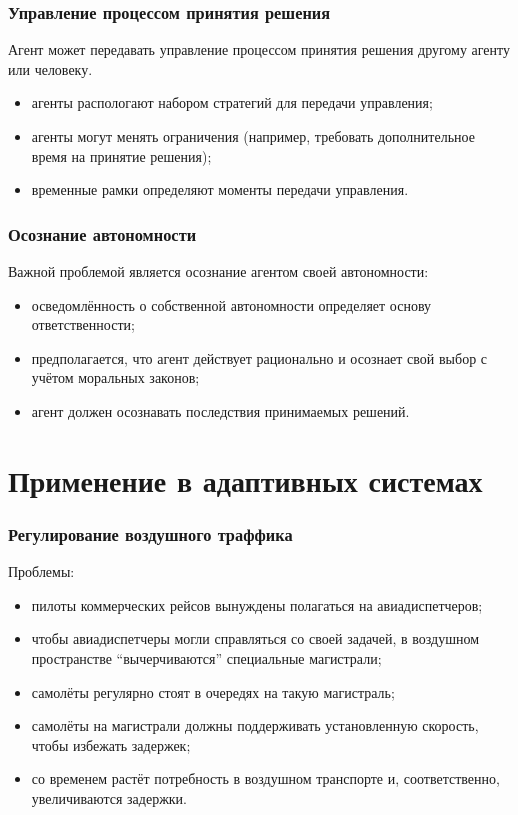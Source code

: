 \documentclass{beamer}
\begin{document}
\begin{frame}
  \frametitle{Управление процессом принятия решения}
  Агент может передавать управление процессом принятия решения другому агенту или человеку.
  \begin{itemize}
    \item агенты распологают набором стратегий для передачи управления;
    \item агенты могут менять ограничения (например,
      требовать дополнительное время на принятие решения);
    \item временные рамки определяют моменты передачи управления.
  \end{itemize}
\end{frame}

\begin{frame}
  \frametitle{Осознание автономности}
  Важной проблемой является осознание агентом своей автономности:
  \begin{itemize}
    \item осведомлённость о собственной автономности определяет основу ответственности;
    \item предполагается, что агент действует рационально и осознает свой выбор
      с учётом моральных законов;
    \item агент должен осознавать последствия принимаемых решений.
  \end{itemize}
\end{frame}

\section{Применение в адаптивных системах}

\begin{frame}
  \frametitle{Регулирование воздушного траффика}
  Проблемы:
  \begin{itemize}
    \item пилоты коммерческих рейсов вынуждены полагаться на авиадиспетчеров;
    \item чтобы авиадиспетчеры могли справляться со своей задачей, в воздушном
      пространстве ``вычерчиваются'' специальные магистрали;
    \item самолёты регулярно стоят в очередях на такую магистраль;
    \item самолёты на магистрали должны поддерживать установленную скорость,
      чтобы избежать задержек;
    \item со временем растёт потребность в воздушном транспорте и, соответственно,
      увеличиваются задержки.
  \end{itemize}
\end{frame}
\end{document}
